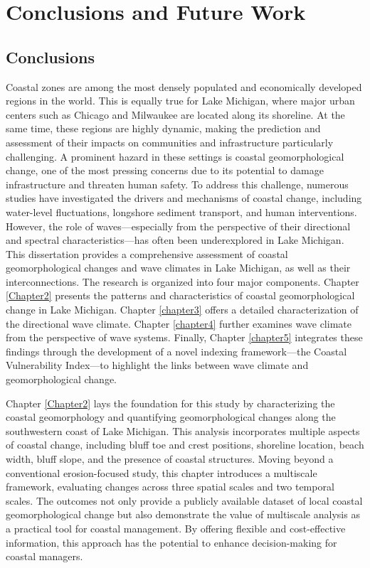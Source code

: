 \chapter{Conclusions and Future Work}
\label{chapter6}

\section{Conclusions}
\label{final_Conclusions}

Coastal zones are among the most densely populated and economically developed
regions in the world. This is equally true for Lake Michigan, where major urban
centers such as Chicago and Milwaukee are located along its shoreline. At the
same time, these regions are highly dynamic, making the prediction and
assessment of their impacts on communities and infrastructure particularly
challenging. A prominent hazard in these settings is coastal geomorphological
change, one of the most pressing concerns due to its potential to damage
infrastructure and threaten human safety. To address this challenge, numerous
studies have investigated the drivers and mechanisms of coastal change,
including water-level fluctuations, longshore sediment transport, and human
interventions. However, the role of waves—especially from the perspective of
their directional and spectral characteristics—has often been underexplored in
Lake Michigan. This dissertation provides a comprehensive assessment of coastal
geomorphological changes and wave climates in Lake Michigan, as well as their
interconnections. The research is organized into four major components. Chapter
\ref{Chapter2} presents the patterns and characteristics of coastal
geomorphological change in Lake Michigan. Chapter \ref{chapter3} offers a
detailed characterization of the directional wave climate. Chapter
\ref{chapter4} further examines wave climate from the perspective of wave
systems. Finally, Chapter \ref{chapter5} integrates these findings through the
development of a novel indexing framework—the Coastal Vulnerability Index—to
highlight the links between wave climate and geomorphological change.

Chapter \ref{Chapter2} lays the foundation for this study by characterizing the
coastal geomorphology and quantifying geomorphological changes along the
southwestern coast of Lake Michigan. This analysis incorporates multiple aspects
of coastal change, including bluff toe and crest positions, shoreline location,
beach width, bluff slope, and the presence of coastal structures. Moving beyond
a conventional erosion-focused study, this chapter introduces a multiscale
framework, evaluating changes across three spatial scales and two temporal
scales. The outcomes not only provide a publicly available dataset of local
coastal geomorphological change but also demonstrate the value of multiscale
analysis as a practical tool for coastal management. By offering flexible and
cost-effective information, this approach has the potential to enhance
decision-making for coastal managers.

